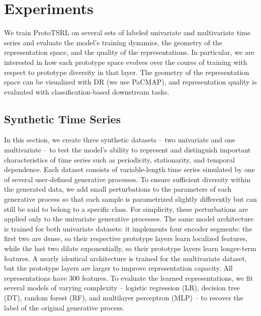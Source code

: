 \documentclass{article}
\begin{document}

\section{Experiments}
\label{sec:experiments}

We train ProtoTSRL on several sets of labeled univariate and multivariate time series and evaluate the model's training dynamics, the geometry of the representation space, and the quality of the representations. In particular, we are interested in how each prototype space evolves over the course of training with respect to prototype diversity in that layer. The geometry of the representation space can be visualized with DR (we use PaCMAP), and representation quality is evaluated with classification-based downstream tasks. 

\subsection{Synthetic Time Series}
\label{subsec:synthetic_univariate}

In this section, we create three synthetic datasets -- two univariate and one multivariate -- to test the model's ability to represent and distinguish important characteristics of time series such as periodicity, stationarity, and temporal dependence. Each dataset consists of variable-length time series simulated by one of several user-defined generative processes. To ensure sufficient diversity within the generated data, we add small perturbations to the parameters of each generative process so that each sample is parametrized slightly differently but can still be said to belong to a specific class. For simplicity, these perturbations are applied only to the univariate generative processes. The same model architecture is trained for both univariate datasets: it implements four encoder segments: the first two are dense, so their respective prototype layers learn localized features, while the last two dilate exponentially, so their prototype layers learn longer-term features. A nearly identical architecture is trained for the multivariate dataset, but the prototype layers are larger to improve representation capacity. All representations have 300 features. To evaluate the learned representations, we fit several models of varying complexity -- logistic regression (LR), decision tree (DT), random forest (RF), and multilayer perceptron (MLP) -- to recover the label of the original generative process.
\end{document}
